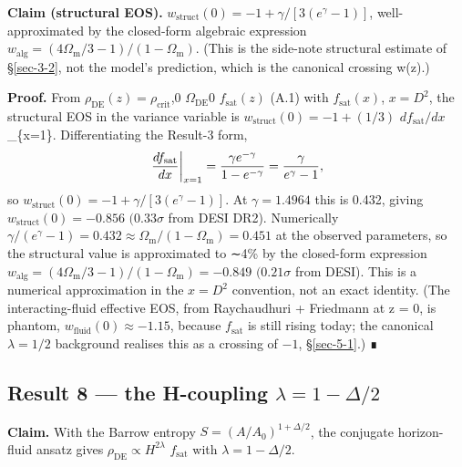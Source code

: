 \documentclass[preprint,12pt]{elsarticle}
\begin{document}
\textbf{Claim (structural EOS).}
\(w_{\mathrm{struct}}(0) = -1 + \gamma /[3(e^{\gamma } - 1)]\),
well-approximated by the closed-form algebraic expression
\(w_{\mathrm{alg}} = (4\Omega _{\mathrm{m}}/3 - 1)/(1 - \Omega _{\mathrm{m}})\).
(This is the side-note structural estimate of §\ref{sec-3-2}, not the
model's prediction, which is the canonical crossing w(z).)

\textbf{Proof.} From \(\rho _\mathrm{DE}(z) = \rho _{\mathrm{crit}}\),0
\(\Omega _\mathrm{DE}0\) \(f_{\mathrm{sat}}(z)\) (A.1) with
\(f_{\mathrm{sat}}(x)\), \(x = D^{2}\), the structural EOS in the
variance variable is \(w_{\mathrm{struct}}(0) = -1 + (1/3)\)
\(df_{\mathrm{sat}}/dx\)\textbar\_\{x=1\}. Differentiating the Result-3
form,
\begin{equation}\left.\frac{df_{\rm sat}}{dx}\right|_{x=1} = \frac{\gamma e^{-\gamma}}{1 - e^{-\gamma}} = \frac{\gamma}{e^\gamma - 1},\end{equation}
so \(w_{\mathrm{struct}}(0) = -1 + \gamma /[3(e^{\gamma } - 1)]\). At
\(\gamma  = 1.4964\) this is 0.432, giving
\(w_{\mathrm{struct}}(0) = -0.856\) \((0.33\sigma\) from DESI DR2).
Numerically
\(\gamma /(e^{\gamma } - 1) = 0.432 \approx  \Omega _{\mathrm{m}}/(1 - \Omega _{\mathrm{m}}) = 0.451\)
at the observed parameters, so the structural value is approximated to
∼4\% by the closed-form expression
\(w_{\mathrm{alg}} = (4\Omega _{\mathrm{m}}/3 - 1)/(1 - \Omega _{\mathrm{m}}) = -0.849\)
\((0.21\sigma\) from DESI). This is a numerical approximation in the
\(x = D^{2}\) convention, not an exact identity. (The interacting-fluid
effective EOS, from Raychaudhuri + Friedmann at z = 0, is phantom,
\(w_{\mathrm{fluid}}(0) \approx  -1.15\), because \(f_{\mathrm{sat}}\)
is still rising today; the canonical \(\lambda  = 1/2\) background
realises this as a crossing of \(-1\), §\ref{sec-5-1}.) ∎

\subsection{\texorpdfstring{Result 8 --- the H-coupling
\(\lambda  = 1 - \Delta /2\)}{Result 8 --- the H-coupling \textbackslash lambda  = 1 - \textbackslash Delta /2}}\label{sec-A-5}

\textbf{Claim.} With the Barrow entropy \(S = (A/A_{0})^{1+\Delta /2}\),
the conjugate horizon-fluid ansatz gives
\(\rho _\mathrm{DE} \propto  H^{2\lambda }\) \(f_{\mathrm{sat}}\) with
\(\lambda  = 1 - \Delta /2\).
\end{document}
